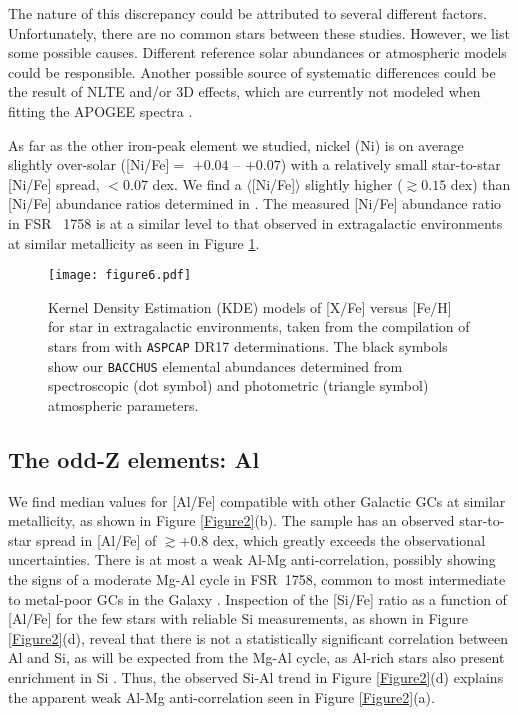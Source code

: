 \documentclass[longauth]{aa} %
\begin{document}
The nature of this discrepancy could be attributed to several different factors. Unfortunately, there are no common stars between these studies. However, we list some possible causes. Different reference solar abundances or atmospheric models could be responsible. Another possible source of systematic differences could be the result of NLTE and/or 3D effects, which are currently not modeled when fitting the APOGEE spectra \citep[see, e.g.,][]{Masseron2019, Meszaros2020}.

As far as the other iron-peak element we studied, nickel (Ni) is on average slightly over-solar ([Ni/Fe]$=$ $+0.04$ -- $+0.07$) with a relatively small star-to-star [Ni/Fe] spread, $< $0.07 dex. We find a $\langle$[Ni/Fe]$\rangle$ slightly higher ($\gtrsim0.15$ dex) than [Ni/Fe] abundance ratios determined in \citet{Villanova2019}. The measured [Ni/Fe] abundance ratio in FSR ~1758 is at a similar level to that observed in extragalactic environments at similar metallicity as seen in Figure \ref{Figure9}.

\begin{figure}
	\begin{center}
		\texttt{[image: figure6.pdf]}
		\caption{Kernel Density Estimation (KDE) models of [X/Fe] versus [Fe/H] for star in extragalactic environments, taken from the compilation of stars from \citet{Helmi2018} with \texttt{ASPCAP} DR17 determinations. The black symbols show our \texttt{BACCHUS} elemental abundances determined from spectroscopic (dot symbol) and photometric (triangle symbol) atmospheric parameters.}
		\label{Figure9}
	\end{center}
\end{figure}

\subsection{The odd-Z elements: Al}

We find median values for [Al/Fe] compatible with other Galactic GCs at similar metallicity, as shown in Figure \ref{Figure2}(b). The sample has an observed star-to-star spread in [Al/Fe] of $\gtrsim +0.8$ dex, which greatly exceeds the observational uncertainties. There is at most a weak Al-Mg anti-correlation, possibly showing the signs of a moderate Mg-Al cycle in FSR~1758, common to most intermediate to metal-poor GCs in the Galaxy \citep{Masseron2019, Meszaros2020, Meszaros2021}. Inspection of the [Si/Fe] ratio as a function of [Al/Fe] for the few stars with reliable Si measurements, as shown in Figure \ref{Figure2}(d), reveal that there is not a statistically significant correlation between Al and Si, as will be expected from the Mg-Al cycle, as Al-rich stars also present enrichment in Si \citep[see, e.g.,][]{Yong2005, Carretta2009}.  Thus, the observed Si-Al trend in Figure \ref{Figure2}(d) explains the apparent weak Al-Mg anti-correlation seen in Figure \ref{Figure2}(a).
\end{document}
